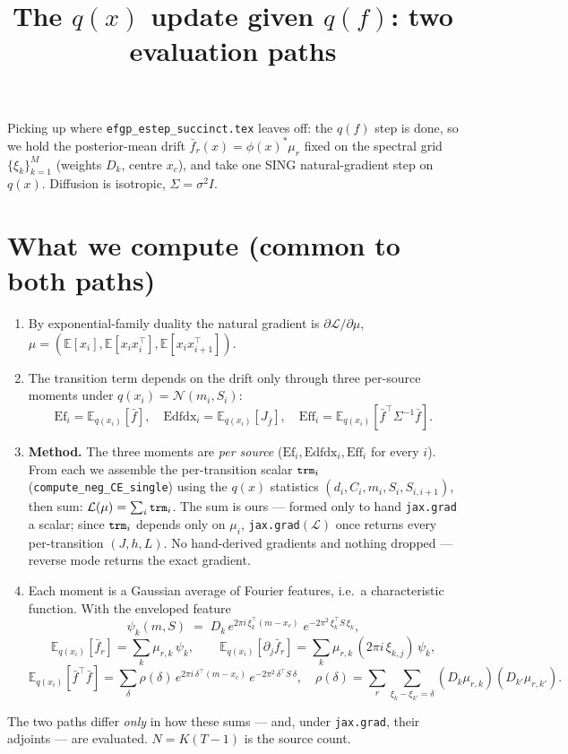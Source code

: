 \documentclass[11pt]{article}
\title{The $q(x)$ update given $q(f)$: two evaluation paths}
\date{}
\newcommand{\E}{\mathbb{E}}
\newcommand{\Eqx}{\E_{q(x_i)}}
\newcommand{\code}[1]{\texttt{\small #1}}
\begin{document}
\maketitle
\vspace{-2.5em}

\noindent
Picking up where \texttt{efgp\_estep\_succinct.tex} leaves off: the $q(f)$
step is done, so we hold the posterior-mean drift
$\bar f_r(x)=\phi(x)^*\mu_r$ fixed on the spectral grid $\{\xi_k\}_{k=1}^M$
(weights $D_k$, centre $x_c$), and take one SING natural-gradient step on
$q(x)$. Diffusion is isotropic, $\Sigma=\sigma^2 I$.

\section{What we compute (common to both paths)}
\begin{enumerate}[leftmargin=1.6em,itemsep=2pt]
\item By exponential-family duality the natural gradient is
  $\partial\mathcal L/\partial\mu$, $\mu=(\E[x_i],\E[x_ix_i^\top],\E[x_ix_{i+1}^\top])$.
\item The transition term depends on the drift only through three
  per-source moments under $q(x_i)=\mathcal N(m_i,S_i)$:
  \[
  \mathrm{Ef}_i=\Eqx[\bar f],\quad
  \mathrm{Edfdx}_i=\Eqx[J_{\bar f}],\quad
  \mathrm{Eff}_i=\Eqx[\bar f^\top\Sigma^{-1}\bar f].
  \]
\item \textbf{Method.} The three moments are \emph{per source}
  ($\mathrm{Ef}_i,\mathrm{Edfdx}_i,\mathrm{Eff}_i$ for every $i$). From each
  we assemble the per-transition scalar $\code{trm}_i$
  (\code{compute\_neg\_CE\_single}) using the $q(x)$ statistics
  $(d_i,C_i,m_i,S_i,S_{i,i+1})$, then sum: $\mathcal L(\mu)=\sum_i\code{trm}_i$.
  The sum is ours --- formed only to hand \code{jax.grad} a scalar; since
  $\code{trm}_i$ depends only on $\mu_i$, \code{jax.grad}$(\mathcal L)$ once
  returns every per-transition $(J,h,L)$. No hand-derived gradients and
  nothing dropped --- reverse mode returns the exact gradient.
\item Each moment is a Gaussian average of Fourier features, i.e.\ a
  characteristic function. With the enveloped feature
  \[
  \psi_k(m,S)\;=\;D_k\,e^{2\pi i\,\xi_k^\top(m-x_c)}\;e^{-2\pi^2\,\xi_k^\top S\,\xi_k},
  \]
  \[
  \Eqx[\bar f_r]=\sum_k \mu_{r,k}\,\psi_k,\qquad
  \Eqx[\partial_j\bar f_r]=\sum_k \mu_{r,k}\,(2\pi i\,\xi_{k,j})\,\psi_k,
  \]
  \[
  \Eqx[\bar f^\top\bar f]=\sum_\delta \rho(\delta)\,
    e^{2\pi i\,\delta^\top(m-x_c)}\,e^{-2\pi^2\,\delta^\top S\,\delta},
  \quad \rho(\delta)=\sum_r\!\!\sum_{\xi_k-\xi_{k'}=\delta}\!\! (D_k\mu_{r,k})(D_{k'}\mu_{r,k'}).
  \]
\end{enumerate}
The two paths differ \emph{only} in how these sums --- and, under
\code{jax.grad}, their adjoints --- are evaluated. $N=K(T{-}1)$ is the
source count.
\end{document}
